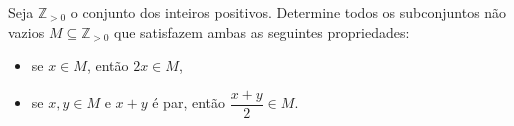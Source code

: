 Seja \(\mathbb{Z}_{>0}\) o conjunto dos inteiros positivos. Determine todos os subconjuntos não vazios \(M \subseteq \mathbb{Z}_{>0}\) que satisfazem ambas as seguintes propriedades:
\begin{itemize}
    \item[(a)] se \(x \in M\), então \(2x \in M\),
    \item[(b)] se \(x, y \in M\) e \(x + y\) é par, então \(\dfrac{x+y}{2} \in M\).
\end{itemize}
